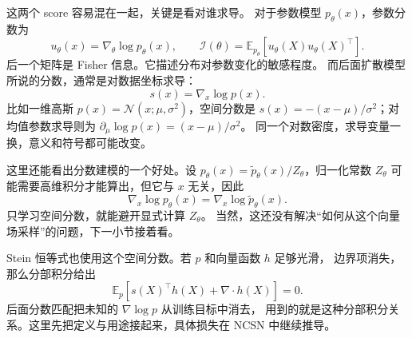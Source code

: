 这两个 score 容易混在一起，关键是看对谁求导。
对于参数模型 $p_\theta(x)$，参数分数为
\[
u_\theta(x)=\nabla_\theta\log p_\theta(x),\qquad
\mathcal I(\theta)=\mathbb E_{p_\theta}[u_\theta(X)u_\theta(X)^\top].
\]
后一个矩阵是 Fisher 信息。它描述分布对参数变化的敏感程度。
而后面扩散模型所说的分数，通常是对数据坐标求导：
\[
s(x)=\nabla_x\log p(x).
\]
比如一维高斯 $p(x)=\mathcal N(x;\mu,\sigma^2)$，空间分数是
$s(x)=-(x-\mu)/\sigma^2$；对均值参数求导则为
$\partial_\mu\log p(x)=(x-\mu)/\sigma^2$。
同一个对数密度，求导变量一换，意义和符号都可能改变。

这里还能看出分数建模的一个好处。设
$p_\theta(x)=\tilde p_\theta(x)/Z_\theta$，归一化常数 $Z_\theta$
可能需要高维积分才能算出，但它与 $x$ 无关，因此
\[
\nabla_x\log p_\theta(x)=\nabla_x\log\tilde p_\theta(x).
\]
只学习空间分数，就能避开显式计算 $Z_\theta$。
当然，这还没有解决“如何从这个向量场采样”的问题，下一小节接着看。

Stein 恒等式也使用这个空间分数。若 $p$ 和向量函数 $h$ 足够光滑，
边界项消失，那么分部积分给出
\[
\mathbb E_p[s(X)^\top h(X)+\nabla\cdot h(X)]=0.
\]
后面分数匹配把未知的 $\nabla\log p$ 从训练目标中消去，
用到的就是这种分部积分关系。这里先把定义与用途接起来，具体损失在 NCSN 中继续推导。
